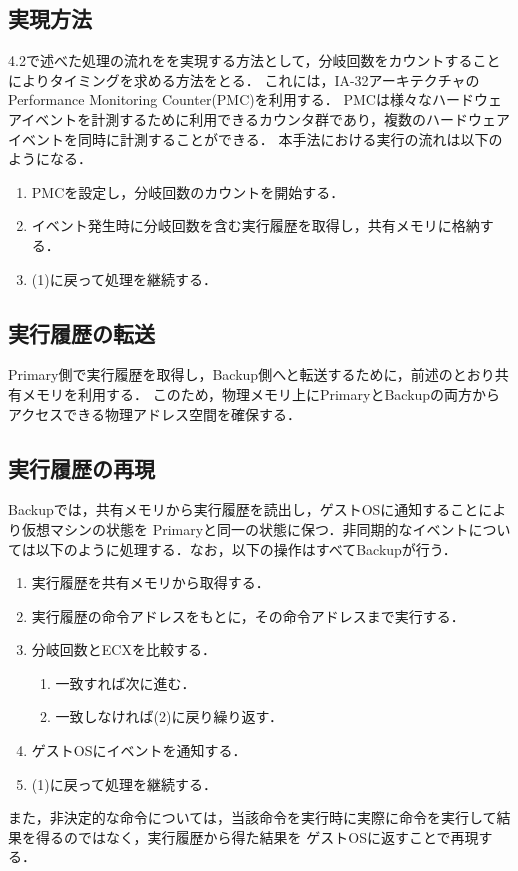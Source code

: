 \documentclass[12pt]{jsarticle}
\begin{document}
\subsection{実現方法}
4.2で述べた処理の流れをを実現する方法として，分岐回数をカウントすることによりタイミングを求める方法をとる．
これには，IA-32アーキテクチャのPerformance Monitoring Counter(PMC)を利用する．
PMCは様々なハードウェアイベントを計測するために利用できるカウンタ群であり，複数のハードウェアイベントを同時に計測することができる．
本手法における実行の流れは以下のようになる．
\begin{enumerate}
\item PMCを設定し，分岐回数のカウントを開始する．
\item イベント発生時に分岐回数を含む実行履歴を取得し，共有メモリに格納する．
\item (1)に戻って処理を継続する．
\end{enumerate}
\subsection{実行履歴の転送}
Primary側で実行履歴を取得し，Backup側へと転送するために，前述のとおり共有メモリを利用する．
このため，物理メモリ上にPrimaryとBackupの両方からアクセスできる物理アドレス空間を確保する．
\subsection{実行履歴の再現}
Backupでは，共有メモリから実行履歴を読出し，ゲストOSに通知することにより仮想マシンの状態を
Primaryと同一の状態に保つ．非同期的なイベントについては以下のように処理する．なお，以下の操作はすべてBackupが行う．
\begin{enumerate}
\item 実行履歴を共有メモリから取得する．
\item 実行履歴の命令アドレスをもとに，その命令アドレスまで実行する．
\item 分岐回数とECXを比較する．
\begin{enumerate}
\item 一致すれば次に進む．
\item 一致しなければ(2)に戻り繰り返す．
\end{enumerate}
\item ゲストOSにイベントを通知する．
\item (1)に戻って処理を継続する．
\end{enumerate}
また，非決定的な命令については，当該命令を実行時に実際に命令を実行して結果を得るのではなく，実行履歴から得た結果を
ゲストOSに返すことで再現する．
\end{document}
